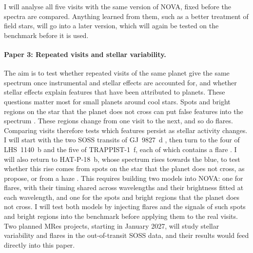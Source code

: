I will analyse all five visits
with the same version of NOVA, fixed before the spectra are compared. Anything learned from them, such as a better treatment of field stars, will go into a
later version, which will again be tested on the benchmark before it is used.

\paragraph{Paper 3: Repeated visits and stellar variability.} The aim is to
test whether repeated visits of the same planet give the same spectrum once instrumental and stellar effects are accounted for, and whether stellar effects explain features that have been attributed to planets. These questions matter most for
small planets around cool stars. Spots and bright regions on the star that the
planet does not cross can put false features into the spectrum
\citep{RackhamEtAl2018}. These regions change from one visit to the next, and so
do flares. Comparing visits therefore tests which features persist as stellar activity changes. I will start with the two SOSS transits of GJ~9827~d
\citep{PiauletGhorayebEtAl2024}, then turn to the four of LHS~1140~b
\citep{CadieuxEtAl2024,GressierEtAl2026} and the five of TRAPPIST-1~f, each of
which contains a flare \citep{LimEtAl2026}. I will also return to HAT-P-18~b, whose spectrum rises towards the blue, to test whether this rise comes from spots on the star that the planet does not cross, as \citet{FournierTondreauEtAl2024} propose, or from a haze \citep{FuEtAl2022}. This requires building two models
into NOVA: one for flares, with their timing shared across wavelengths and
their brightness fitted at each wavelength, and one for the spots and bright
regions that the planet does not cross. I will test both models by injecting
flares and the signals of such spots and bright regions into the benchmark before applying them to the
real visits. Two planned MRes projects, starting in January 2027, will study
stellar variability and flares in the out-of-transit SOSS data, and their results would
feed directly into this paper.

